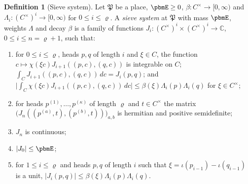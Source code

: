 \documentclass[10pt]{amsart}
\theoremstyle{definition}
\newtheorem{definition}[theorem]{Definition}
\theoremstyle{remark}
\newcommand{\C}{\mathbb C}
\begin{document}
\begin{definition}[Sieve system]\label{pbm:system}
Let $\mathfrak P$ be a place, $\pbmE\ge0$, $\beta\colon C^\times\to[0,\infty)$ and $\Lambda_i\colon
(C^\times)^i\to[0,\infty)$ for $0\le i\le\varrho$. A \emph{sieve system} at $\mathfrak P$ with mass
$\pbmE$, weights $\Lambda$ and decay $\beta$ is a family of functions $J_i\colon(C^\times)^i\times
(C^\times)^i\to\C$, $0\le i\le n=\varrho+1$, such that:
\begin{enumerate}
\item[(S1)] for $0\le i\le\varrho$, heads $p,q$ of length $i$ and $\xi\in C$, the function $c\mapsto
\chi(\xi c)J_{i+1}((p,c),(q,c))$ is integrable on $C$; $\int_CJ_{i+1}((p,c),(q,c))\,dc=J_i(p,q)$; and
$\bigl|\int_C\chi(\xi c)J_{i+1}((p,c),(q,c))\,dc\bigr|\le\beta(\xi)\Lambda_i(p)\Lambda_i(q)$ for
$\xi\in C^\times$;
\item[(S2)] for heads $p^{(1)},\dots,p^{(\kappa)}$ of length $\varrho$ and $t\in C^\times$ the matrix
$\bigl(J_n((p^{(a)},t),(p^{(b)},t))\bigr)_{a,b}$ is hermitian and positive semidefinite;
\item[(S3)] $J_n$ is continuous;
\item[(S4)] $|J_0|\le\pbmE$;
\item[(S5)] for $1\le i\le\varrho$ and heads $p,q$ of length $i$ such that $\xi=\iota(p_{i-1})-\iota(
q_{i-1})$ is a unit, $|J_i(p,q)|\le\beta(\xi)\Lambda_i(p)\Lambda_i(q)$.
\end{enumerate}
\end{definition}
\end{document}
